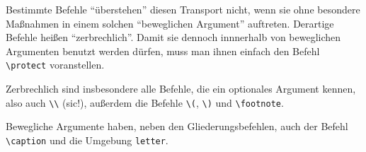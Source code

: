 Bestimmte Befehle "`überstehen"' diesen Transport nicht, wenn sie
ohne besondere Maßnahmen in einem solchen "`beweglichen Argument"'
auftreten.
Derartige Befehle heißen "`zerbrechlich"'.  Damit sie dennoch innnerhalb
von beweglichen Argumenten benutzt werden dürfen, 
muss man ihnen einfach den Befehl \verb|\protect| voranstellen.

Zerbrechlich sind insbesondere alle Befehle, die ein optionales Argument
kennen, also auch \verb|\\| (sic!),
außerdem die Befehle \verb|\(|, \verb|\)| und \verb|\footnote|.

Bewegliche Argumente haben, neben den Gliederungsbefehlen,
auch der Befehl \verb|\caption| und die Umgebung \texttt{letter}.


\endinput
